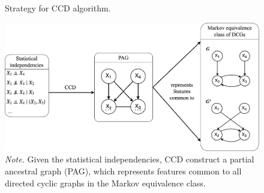 \documentclass[11pt]{article}
\theoremstyle{definition}
\begin{document}
\begin{figure}[H]
    \centering
        \caption{Strategy for CCD algorithm.}
        \includegraphics[width=1.0\textwidth]{figures/CCDsummary.png}
        \vspace{1mm}
        \caption*{\textit{Note.} Given the statistical independencies, CCD construct a partial ancestral graph (PAG), which represents features common to all directed cyclic graphs in the Markov equivalence class.}
    \label{fig:6}
\end{figure}


\end{document}
